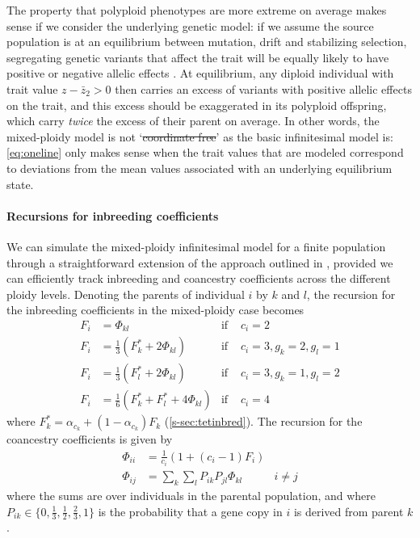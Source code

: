 \documentclass[12pt,a4paper]{article}
\providecommand{\DIFadd}[1]{{\protect\color{blue}\uwave{#1}}} %
\providecommand{\DIFdel}[1]{{\protect\color{red}\sout{#1}}}                      %
\providecommand{\DIFaddbegin}{} %
\providecommand{\DIFaddend}{} %
\providecommand{\DIFdelbegin}{} %
\providecommand{\DIFdelend}{} %
\begin{document}
    The property that polyploid phenotypes are more extreme on average makes sense
    if we consider the underlying genetic model: if we assume the source population
    is at an equilibrium between mutation, drift and stabilizing selection,
    segregating genetic variants that affect the trait will be equally likely to
    have positive or negative allelic effects \citep{hayward2022}.
    At equilibrium, any diploid individual with trait value $z - \bar{z}_2 > 0$
    then carries an excess of variants with positive allelic effects on the trait,
    and this excess should be exaggerated in its polyploid offspring, which carry
    \textit{twice} the excess of their parent on average.
    In other words, the mixed-ploidy model is not `\DIFdelbegin \DIFdel{coordinate free}\DIFdelend \DIFaddbegin \DIFadd{coordinate-free}\DIFaddend ' as the basic
    infinitesimal model is: \cref{eq:oneline} only makes sense when the trait
    values that are modeled correspond to deviations from the mean values
    associated with an underlying equilibrium state.


    \paragraph{Recursions for inbreeding coefficients}

    We can simulate the mixed-ploidy infinitesimal model for a finite population
    through a straightforward extension of the approach outlined in
    \cite{barton2017}, provided we can efficiently track inbreeding and coancestry
    coefficients across the different ploidy levels.
    Denoting the parents of individual $i$ by $k$ and $l$, the recursion for the
    inbreeding coefficients in the mixed-ploidy case becomes
    \begin{align}
        F_i &= \Phi_{kl} & \text{if } & c_i = 2 \nonumber \\ 
        F_i &= \frac{1}{3}\left(F_k^\ast + 2\Phi_{kl}\right) & \text{if } 
            & c_i = 3, g_k = 2, g_l = 1 \nonumber \\ 
        F_i &= \frac{1}{3}\left(F_l^\ast + 2\Phi_{kl}\right) & \text{if } 
            & c_i = 3, g_k = 1, g_l = 2 \nonumber \\ 
        F_i &= \frac{1} 6 (F_k^\ast + F_l^\ast + 4\Phi_{kl}) & \text{if } & c_i = 4
    \end{align}
    where $F_k^\ast = \alpha_{c_k} + (1-\alpha_{c_k})F_k$ (\cref{s-sec:tetinbred}).
    The recursion for the coancestry coefficients is given by
    \begin{align}
        \Phi_{ii} &= \frac{1}{c_{i}} \left(1 + (c_i-1)F_i\right) \nonumber \\
        \Phi_{ij} &= \sum_k \sum_l P_{ik}P_{jl} \Phi_{kl} & i \ne j 
        \label{eq:coancestry}
    \end{align}
    where the sums are over individuals in the parental population, and where
    $P_{ik} \in \{0, \frac{1} 3, \frac{1} 2, \frac{2} 3, 1\}$ is the probability that a
    gene copy in \DIFaddbegin \DIFadd{individual }\DIFaddend $i$ is derived from parent $k$.
\end{document}
